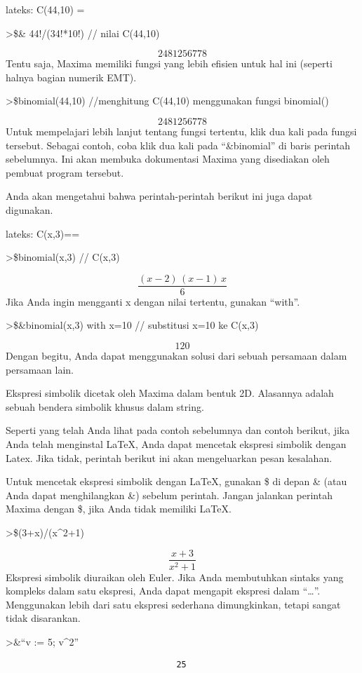 \documentclass[
]{book}
\begin{document}
lateks: C(44,10) = 

\textgreater\$\& 44!/(34!*10!) // nilai C(44,10)

\[2481256778\]Tentu saja, Maxima memiliki fungsi yang lebih efisien untuk hal ini (seperti halnya bagian numerik EMT).

\textgreater\$binomial(44,10) //menghitung C(44,10) menggunakan fungsi binomial()

\[2481256778\]Untuk mempelajari lebih lanjut tentang fungsi tertentu, klik dua kali pada fungsi tersebut. Sebagai contoh, coba klik dua kali pada ``\&binomial'' di baris perintah sebelumnya. Ini akan membuka dokumentasi Maxima yang disediakan oleh pembuat program tersebut.

Anda akan mengetahui bahwa perintah-perintah berikut ini juga dapat digunakan.

lateks: C(x,3)==

\textgreater\$binomial(x,3) // C(x,3)

\[\frac{\left(x-2\right)\,\left(x-1\right)\,x}{6}\]Jika Anda ingin mengganti x dengan nilai tertentu, gunakan ``with''.

\textgreater\$\&binomial(x,3) with x=10 // substitusi x=10 ke C(x,3)

\[120\]Dengan begitu, Anda dapat menggunakan solusi dari sebuah persamaan dalam persamaan lain.

Ekspresi simbolik dicetak oleh Maxima dalam bentuk 2D. Alasannya adalah sebuah bendera simbolik khusus dalam string.

Seperti yang telah Anda lihat pada contoh sebelumnya dan contoh berikut, jika Anda telah menginstal LaTeX, Anda dapat mencetak ekspresi simbolik dengan Latex. Jika tidak, perintah berikut ini akan mengeluarkan pesan kesalahan.

Untuk mencetak ekspresi simbolik dengan LaTeX, gunakan \$ di depan \& (atau Anda dapat menghilangkan \&) sebelum perintah. Jangan jalankan perintah Maxima dengan \$, jika Anda tidak memiliki LaTeX.

\textgreater\$(3+x)/(x\^{}2+1)

\[\frac{x+3}{x^2+1}\]Ekspresi simbolik diuraikan oleh Euler. Jika Anda membutuhkan sintaks yang kompleks dalam satu ekspresi, Anda dapat mengapit ekspresi dalam ``\ldots{}''. Menggunakan lebih dari satu ekspresi sederhana dimungkinkan, tetapi sangat tidak disarankan.

\textgreater\&``v := 5; v\^{}2''

\begin{verbatim}
                                  25
\end{verbatim}
\end{document}
